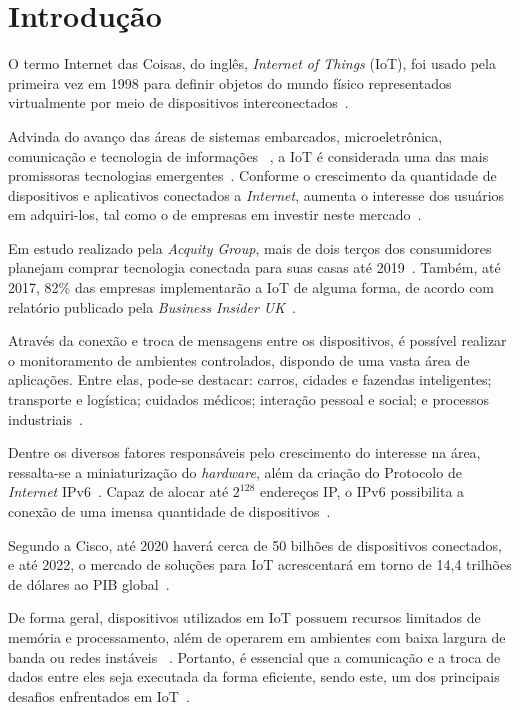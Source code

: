 \chapter{Introdução}

O termo Internet das Coisas, do inglês, \textit{Internet of Things} (IoT), foi usado pela primeira vez em 1998 para definir objetos do mundo físico representados virtualmente por meio de dispositivos interconectados~\cite{weber2010internet}. 

Advinda do avanço das áreas de sistemas embarcados, microeletrônica, comunicação e tecnologia de informações ~\cite{iot2016}, a IoT é considerada uma das mais promissoras tecnologias emergentes~\cite{gartner2015gartner}. Conforme o crescimento da quantidade de dispositivos e aplicativos conectados a \textit{Internet}, aumenta o interesse dos usuários em adquiri-los, tal como o de empresas em investir neste mercado~\cite{mukherjee2016ranking}.

Em estudo realizado pela \textit{Acquity Group}, mais de dois terços dos consumidores planejam comprar tecnologia conectada para suas casas até 2019~\cite{press2014internet}. Também, até 2017, 82\% das empresas implementarão a IoT de alguma forma, de acordo com relatório publicado pela \textit{Business Insider UK}~\cite{danova2014bi}.

Através da conexão e troca de mensagens entre os dispositivos, é possível realizar o monitoramento de ambientes controlados,  dispondo de uma vasta área de aplicações. Entre elas, pode-se destacar: carros, cidades e fazendas inteligentes; transporte e logística; cuidados médicos; interação pessoal e social; e processos industriais~\cite{sankarinternet, bandyopadhyay2011internet, atzori2010internet}.

Dentre os diversos fatores responsáveis pelo crescimento do interesse na área, ressalta-se a miniaturização do \textit{hardware}, além da criação do Protocolo de \textit{Internet} IPv6~\cite{press2014internet}. Capaz de alocar até $2^{128}$ endereços IP, o IPv6 possibilita a conexão de uma imensa quantidade de dispositivos~\cite{mukherjee2016ranking}.

Segundo a Cisco, até 2020 haverá cerca de 50 bilhões de dispositivos conectados, e até 2022, o mercado de soluções para IoT acrescentará em torno de 14,4 trilhões de dólares ao PIB global~\cite{morgan2014forbes}.

De forma geral, dispositivos utilizados em IoT possuem recursos limitados de memória e processamento, além de operarem em ambientes com baixa largura de banda ou redes instáveis ~\cite{weber2010internet, iot2016, suo2012security}. Portanto, é essencial que a comunicação e a troca de dados entre eles seja executada da forma eficiente, sendo este, um dos principais desafios enfrentados em IoT~\cite{bandyopadhyay2011internet, suo2012security}.

